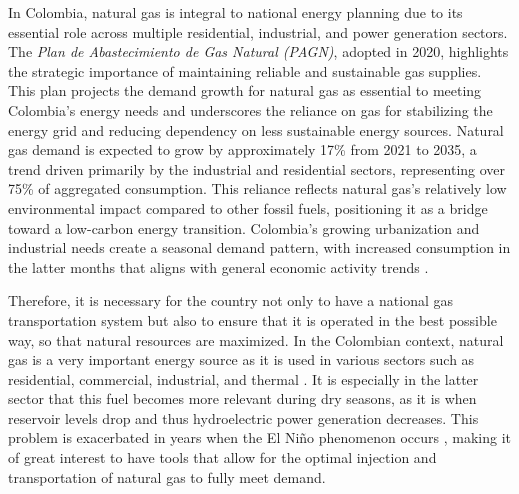 In Colombia, natural gas is integral to national energy planning due to its essential role across multiple residential, industrial, and power generation sectors. The \textit{Plan de Abastecimiento de Gas Natural (PAGN)}, adopted in 2020, highlights the strategic importance of maintaining reliable and sustainable gas supplies. This plan projects the demand growth for natural gas as essential to meeting Colombia's energy needs and underscores the reliance on gas for stabilizing the energy grid and reducing dependency on less sustainable energy sources. Natural gas demand is expected to grow by approximately 17\% from 2021 to 2035, a trend driven primarily by the industrial and residential sectors, representing over 75\% of aggregated consumption. This reliance reflects natural gas's relatively low environmental impact compared to other fossil fuels, positioning it as a bridge toward a low-carbon energy transition. Colombia's growing urbanization and industrial needs create a seasonal demand pattern, with increased consumption in the latter months that aligns with general economic activity trends \cite{Promigas_2021}.


Therefore, it is necessary for the country not only to have a national gas transportation system but also to ensure that it is operated in the best possible way, so that natural resources are maximized. In the Colombian context, natural gas is a very important energy source as it is used in various sectors such as residential, commercial, industrial, and thermal \cite{Restrepo-Trujillo_Moreno-Chuquen_Jiménez-García_Flores_Chamorro_2022}. It is especially in the latter sector that this fuel becomes more relevant during dry seasons, as it is when reservoir levels drop and thus hydroelectric power generation decreases. This problem is exacerbated in years when the El Niño phenomenon occurs \cite{paper-col}, making it of great interest to have tools that allow for the optimal injection and transportation of natural gas to fully meet demand.

